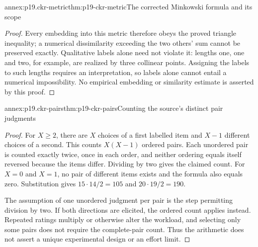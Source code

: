 \begin{annexitem}{annex:p19.ckr-metric}{thm:p19-ckr-metric}{The corrected Minkowski formula and its scope}
\begin{proof}
Every embedding into this metric therefore obeys the proved
triangle inequality; a numerical dissimilarity exceeding the
two others' sum cannot be preserved exactly. Qualitative labels
alone need not violate it: lengths one, one and two, for example,
are realized by three collinear points. Assigning the labels
to such lengths requires an interpretation, so labels alone
cannot entail a numerical impossibility. No empirical embedding
or similarity estimate is asserted by this proof.
\end{proof}
\end{annexitem}

\begin{annexitem}{annex:p19.ckr-pairs}{thm:p19-ckr-pairs}{Counting the source's distinct pair judgments}
\begin{proof}
For \(X\geq2\), there are \(X\) choices of a first labelled
item and \(X-1\) different choices of a second. This counts
\(X(X-1)\) ordered pairs. Each unordered pair is counted
exactly twice, once in each order, and neither ordering equals
itself reversed because the items differ. Dividing by two gives
the claimed count. For \(X=0\) and \(X=1\), no pair of
different items exists and the formula also equals zero.
Substitution gives \(15\cdot14/2=105\) and
\(20\cdot19/2=190\).

The assumption of one unordered judgment per pair is the step
permitting division by two. If both directions are elicited,
the ordered count applies instead. Repeated ratings multiply
or otherwise alter the workload, and selecting only some pairs
does not require the complete-pair count. Thus the arithmetic
does not assert a unique experimental design or an effort limit.
\end{proof}
\end{annexitem}

